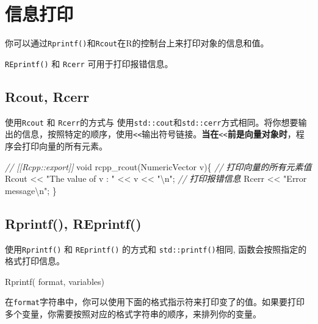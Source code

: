 \documentclass[]{ctexbook}
\newenvironment{Shaded}{\begin{snugshade}}{\end{snugshade}}
\newcommand{\DataTypeTok}[1]{\textcolor[rgb]{0.13,0.29,0.53}{#1}}
\newcommand{\SpecialCharTok}[1]{\textcolor[rgb]{0.00,0.00,0.00}{#1}}
\newcommand{\StringTok}[1]{\textcolor[rgb]{0.31,0.60,0.02}{#1}}
\newcommand{\CommentTok}[1]{\textcolor[rgb]{0.56,0.35,0.01}{\textit{#1}}}
\newcommand{\NormalTok}[1]{#1}
\begin{document}
\chapter{信息打印}\label{print}

你可以通过\texttt{Rprintf()}和\texttt{Rcout}在R的控制台上来打印对象的信息和值。

\texttt{REprintf()} 和 \texttt{Rcerr} 可用于打印报错信息。

\section{Rcout, Rcerr}\label{Rcout}

使用\texttt{Rcout} 和 \texttt{Rcerr}的方式与
使用\texttt{std::cout}和\texttt{std::cerr}方式相同。将你想要输出的信息，按照特定的顺序，使用\texttt{\textless{}\textless{}}输出符号链接。\textbf{当在}\texttt{\textless{}\textless{}}\textbf{前是向量对象时}，程序会打印向量的所有元素。

\begin{Shaded}
\begin{Highlighting}[]
\CommentTok{// [[Rcpp::export]]}
\DataTypeTok{void}\NormalTok{ rcpp_rcout(NumericVector v)\{}
  \CommentTok{// 打印向量的所有元素值}
\NormalTok{  Rcout << }\StringTok{"The value of v : "}\NormalTok{ << v << }\StringTok{"}\SpecialCharTok{\textbackslash{}n}\StringTok{"}\NormalTok{;}
  \CommentTok{// 打印报错信息}
\NormalTok{  Rcerr << }\StringTok{"Error message}\SpecialCharTok{\textbackslash{}n}\StringTok{"}\NormalTok{;}
\NormalTok{\}}
\end{Highlighting}
\end{Shaded}

\section{Rprintf(), REprintf()}\label{Rprintf}

使用\texttt{Rprintf()} 和 \texttt{REprintf()} 的方式和
\texttt{std::printf()}相同, 函数会按照指定的格式打印信息。

\begin{Shaded}
\begin{Highlighting}[]
\NormalTok{Rprintf( format, variables)}
\end{Highlighting}
\end{Shaded}

在\texttt{format}字符串中，你可以使用下面的格式指示符来打印变了的值。如果要打印多个变量，你需要按照对应的格式字符串的顺序，来排列你的变量。
\end{document}
